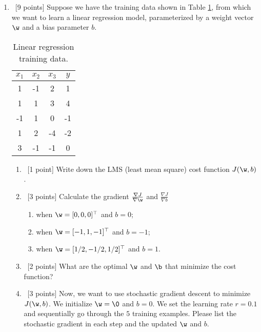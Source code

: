 \documentclass[12pt, fullpage,letterpaper]{article}
\begin{document}
\begin{enumerate}
\item~[9 points] Suppose we have the training data shown in Table \ref{tb:1}, from which we want to learn a linear regression model, parameterized by a weight vector $\w$ and a bias parameter $b$.  
\begin{table}
	\centering
	\begin{tabular}{ccc|c}
		$x_1 $ & $x_2$ & $x_3$ &  $y$\\ 
		\hline\hline
		1 & -1 & 2 & 1 \\ \hline
		1 & 1 & 3 & 4 \\ \hline
		-1 & 1 & 0 & -1 \\ \hline
		1 & 2 & -4 & -2 \\ \hline
		3 & -1 & -1 & 0\\ \hline
	\end{tabular}
	\caption{Linear regression training data.}\label{tb:1}
\end{table}

\begin{enumerate}
	\item~[1 point] Write down the LMS (least mean square) cost function $J(\w, b)$. 
	\item~[3 points] Calculate the gradient $\frac{\nabla J}{\nabla \w}$ and $\frac{\nabla J}{\nabla b}$ 
	\begin{enumerate}
		\item when $\w = [0,0,0]^\top$ and $b = 0$;
		\item when $\w = [-1,1,-1]^\top$ and $b = -1$;
		\item when $\w = [1/2,-1/2,1/2]^\top$ and $b = 1$.
	\end{enumerate}
	\item~[2 points] What are the optimal $\w$ and $\b$ that minimize the cost function? 
	\item~[3 points] Now, we want to use stochastic gradient descent to minimize $J(\w, b)$. We initialize $\w = \0$ and $b = 0$. We set the learning rate $r = 0.1$ and sequentially go through the $5$ training examples. Please list the stochastic gradient in each step and the updated $\w$ and $b$.  
\end{enumerate}
\end{enumerate}
\end{document}

